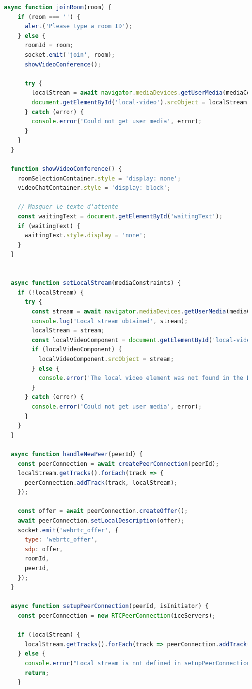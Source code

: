\documentclass[12pt, a4paper, oneside]{Thesis}
\begin{document}
\begin{lstlisting}[language=JavaScript, caption={Fonctions Principales}, label=Fonctions Principales]
    async function joinRoom(room) {
    if (room === '') {
      alert('Please type a room ID');
    } else {
      roomId = room;
      socket.emit('join', room);
      showVideoConference();
      
      try {
        localStream = await navigator.mediaDevices.getUserMedia(mediaConstraints);
        document.getElementById('local-video').srcObject = localStream;
      } catch (error) {
        console.error('Could not get user media', error);
      }
    }
  }

  function showVideoConference() {
    roomSelectionContainer.style = 'display: none';
    videoChatContainer.style = 'display: block';

    // Masquer le texte d'attente
    const waitingText = document.getElementById('waitingText');
    if (waitingText) {
      waitingText.style.display = 'none';
    }
  }


  async function setLocalStream(mediaConstraints) {
    if (!localStream) {
      try {
        const stream = await navigator.mediaDevices.getUserMedia(mediaConstraints);
        console.log('Local stream obtained', stream);
        localStream = stream;
        const localVideoComponent = document.getElementById('local-video');
        if (localVideoComponent) {
          localVideoComponent.srcObject = stream;
        } else {
          console.error('The local video element was not found in the DOM.');
        }
      } catch (error) {
        console.error('Could not get user media', error);
      }
    }
  }

  async function handleNewPeer(peerId) {
    const peerConnection = await createPeerConnection(peerId);
    localStream.getTracks().forEach(track => {
      peerConnection.addTrack(track, localStream);
    });

    const offer = await peerConnection.createOffer();
    await peerConnection.setLocalDescription(offer);
    socket.emit('webrtc_offer', {
      type: 'webrtc_offer',
      sdp: offer,
      roomId,
      peerId,
    });
  }

  async function setupPeerConnection(peerId, isInitiator) {
    const peerConnection = new RTCPeerConnection(iceServers);

    if (localStream) {
      localStream.getTracks().forEach(track => peerConnection.addTrack(track, localStream));
    } else {
      console.error("Local stream is not defined in setupPeerConnection");
      return;
    }


\end{lstlisting}
\end{document}
